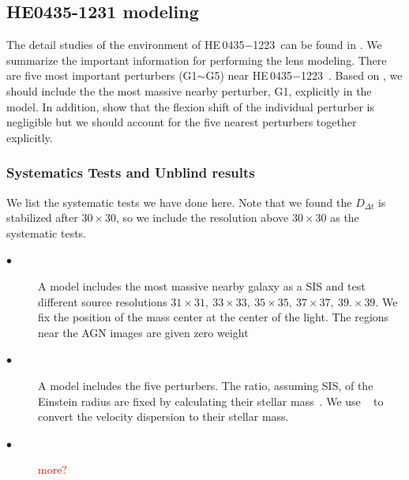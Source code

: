 \documentclass[useAMS,usenatbib]{mnras}
\newcommand\todo[1]{\textcolor{red}{#1}}
\newcommand\he{HE\,0435$-$1223}
\def\dt{D_{\Delta t}}
\begin{document}
\subsection{HE0435-1231 modeling}
\label{subsec:HEmodeling}
The detail studies of the environment of \he~can be found in \citet{SluseEtal17,RusuEtal17,TihhonovaEtal17}. 
We summarize the important information for performing the lens modeling. 
There are five most important perturbers (G1$\sim$G5) near \he~\citep[see Fig. 3 in][]{WongEtal17}. Based on \citet{McCullyEtal14,McCullyEtal17}, we should include the the most massive nearby perturber, G1, explicitly in the model. In addition, \citet{SluseEtal17} show that the flexion shift of the individual perturber is negligible but we should account for the five nearest perturbers together explicitly.


\subsubsection{Systematics Tests and Unblind results}
We list the systematic tests we have done here. Note that we found the $\dt$ is stabilized after $30\times 30$, so we include the resolution above $30\times 30$ as the systematic tests.
\begin{description}
  \item[$\bullet$] A model includes the most massive nearby galaxy as a SIS and test different source resolutions $31\times31,~33\times33,~35\times35,~37\times37,~39. \times39$. We fix the position of the mass center at the center of the light. The regions near the AGN images are given zero weight
  \item[$\bullet$] A model includes the five perturbers. The ratio, assuming SIS, of the Einstein radius are fixed by calculating their stellar mass~\citep{RusuEtal17}. We use ~\citet{BernnardiEtal11} to convert the velocity dispersion to their stellar mass.
  \item[$\bullet$] \todo{more?}
\end{description}
\end{document}
